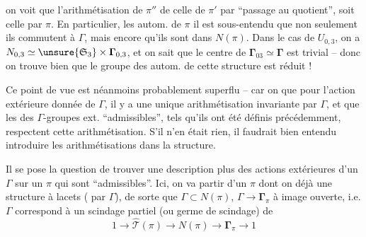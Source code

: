 
on voit que l'arithmétisation de $\pi''$  de celle de $\pi'$ par ``passage au quotient'', soit celle  par $\pi$.  En particulier,  les autom. de $\pi$ il est sous-entendu que  non seulement ils commutent à $\Gamma$, mais encore qu'ils sont dans $N(\pi)$.  Dans le cas de $U_{0,3}$, on a $N_{0,3}\simeq\unsure{\mathfrak S_3}\times\boldsymbol{\Gamma}_{0,3}$, et on sait que le centre de $\boldsymbol{\Gamma}_{03}\simeq\boldsymbol{\Gamma}$ est trivial -- donc on trouve bien que le groupe des autom. de cette structure est réduit   !

Ce point de vue est néanmoins probablement superflu -- car on  que pour l'action extérieure donnée de $\Gamma$, il y a une unique arithmétisation invariante par $\Gamma$, et que les   des $\Gamma$-groupes ext. ``admissibles'', tels qu'ils ont été définis précédemment, respectent  cette arithmétisation. S'il n'en était rien, il faudrait bien entendu introduire les arithmétisations dans la structure.




Il se pose la question de trouver une description plus   des actions extérieures d'un $\Gamma$ sur un $\pi$ qui sont ``admissibles''.  Ici, on va partir d'un $\pi$ dont on  déjà une structure à lacets  ( par $\Gamma$), de  sorte que $\Gamma\subset N(\pi)$, $\Gamma\longrightarrow\boldsymbol{\Gamma}_\pi$  à image ouverte,  i.e. $\Gamma$ correspond à un scindage partiel (ou germe de scindage) de 
\[
1\longrightarrow\widehat{\mathcal T}(\pi)\longrightarrow N(\pi)\longrightarrow\boldsymbol{\Gamma}_\pi\longrightarrow1
\]

